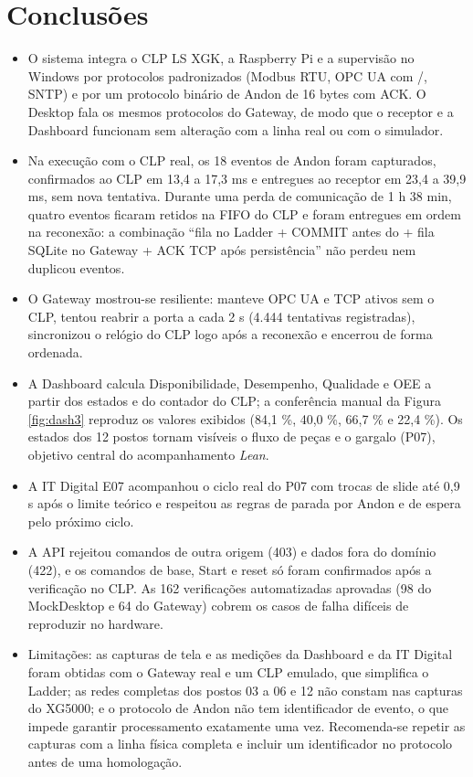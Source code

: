 \section{Conclusões}

\begin{itemize}
    \item O sistema integra o CLP LS XGK, a Raspberry Pi e a supervisão no Windows por protocolos padronizados (Modbus RTU, OPC UA com /, SNTP) e por um protocolo binário de Andon de 16 bytes com ACK. O Desktop fala os mesmos protocolos do Gateway, de modo que o receptor e a Dashboard funcionam sem alteração com a linha real ou com o simulador.
    \item Na execução com o CLP real, os 18 eventos de Andon foram capturados, confirmados ao CLP em 13,4 a 17,3 ms e entregues ao receptor em 23,4 a 39,9 ms, sem nova tentativa. Durante uma perda de comunicação de 1 h 38 min, quatro eventos ficaram retidos na FIFO do CLP e foram entregues em ordem na reconexão: a combinação ``fila no Ladder + COMMIT antes do  + fila SQLite no Gateway + ACK TCP após persistência'' não perdeu nem duplicou eventos.
    \item O Gateway mostrou-se resiliente: manteve OPC UA e TCP ativos sem o CLP, tentou reabrir a porta a cada 2 s (4.444 tentativas registradas), sincronizou o relógio do CLP logo após a reconexão e encerrou de forma ordenada.
    \item A Dashboard calcula Disponibilidade, Desempenho, Qualidade e OEE a partir dos estados e do contador do CLP; a conferência manual da Figura \ref{fig:dash3} reproduz os valores exibidos (84,1 \%, 40,0 \%, 66,7 \% e 22,4 \%). Os estados dos 12 postos tornam visíveis o fluxo de peças e o gargalo (P07), objetivo central do acompanhamento \textit{Lean}.
    \item A IT Digital E07 acompanhou o ciclo real do P07 com trocas de slide até 0,9 s após o limite teórico e respeitou as regras de parada por Andon e de espera pelo próximo ciclo.
    \item A API rejeitou comandos de outra origem (403) e dados fora do domínio (422), e os comandos de base, Start e reset só foram confirmados após a verificação no CLP. As 162 verificações automatizadas aprovadas (98 do MockDesktop e 64 do Gateway) cobrem os casos de falha difíceis de reproduzir no hardware.
    \item Limitações: as capturas de tela e as medições da Dashboard e da IT Digital foram obtidas com o Gateway real e um CLP emulado, que simplifica o Ladder; as redes completas dos postos 03 a 06 e 12 não constam nas capturas do XG5000; e o protocolo de Andon não tem identificador de evento, o que impede garantir processamento exatamente uma vez. Recomenda-se repetir as capturas com a linha física completa e incluir um identificador no protocolo antes de uma homologação.
\end{itemize}
